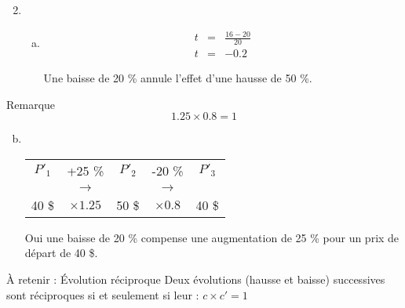 \documentclass[xcolor={dvipsnames}]{beamer}
\begin{document}
\begin{frame}{}

\begin{enumerate}[1.]
	\setcounter{enumi}{1}
	\item 
		\begin{enumerate}[a.]
			\item \begin{eqnarray*}
				t &=& \frac{16 - 20}{20}\\
				t &=& \num{-0.2}
			\end{eqnarray*} 
			
			Une baisse de 20 \% annule l'effet d'une hausse de 50 \%.\pause 
		\end{enumerate}
		
	
		
		
\end{enumerate}

\begin{block}{Remarque}
	\begin{equation*}
		\num{1.25} \times \num{0.8} = 1
	\end{equation*}\pause
\end{block}



\end{frame}




\begin{frame}{}

\begin{enumerate}[a.]
	\setcounter{enumi}{1}
	\item \
	
	\begin{table}[h!]
		\centering{\ }
		\begin{tabular}{|@{\ \ }c@{\ \ }c@{\ \ }c@{\ \ }c@{\ \ }c@{\ \ }|}
			\hline
			$P'_1$ & +\num{25} \%  & $P'_2$ & -\num{20} \%  & $P'_3$ \\
			& {\LARGE$\rightarrow$} &	&	 {\LARGE$\rightarrow$} &	\\
			\num{40} \$ & $\times \num{1.25} $ & 50 \$ &  $\times \num{0.8}$ & \num{40} \$ \\
			\hline
		\end{tabular}
		
	\end{table}

Oui une baisse de 20 \% compense une augmentation de 25 \% pour un prix de départ de 40 \$.
	
	
\end{enumerate}


\begin{alertblock}{\`A retenir : \'Evolution réciproque}
	Deux évolutions (hausse et baisse) successives sont réciproques si et seulement si leur  : $c \times c' = 1$
\end{alertblock}

\end{frame}
\end{document}
